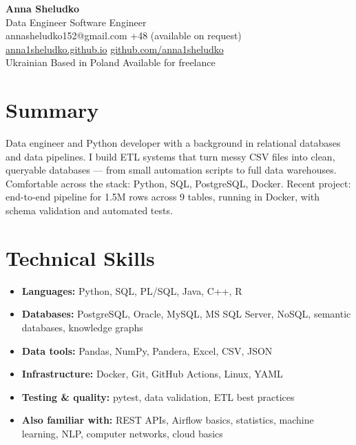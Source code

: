 \documentclass[10pt,a4paper]{article}
\begin{document}
\begin{center}
  {\LARGE\bfseries Anna Sheludko}\\[0.35em]
  Data Engineer \textbar{} Software Engineer\\[0.3em]
  annasheludko152@gmail.com \textbar{} +48 (available on request)\\
  \href{https://anna1sheludko.github.io}{anna1sheludko.github.io} \textbar{} 
  \href{https://github.com/anna1sheludko}{github.com/anna1sheludko}\\[0.3em]
  Ukrainian \textbar{} Based in Poland \textbar{} Available for freelance
\end{center}

\section{Summary}
Data engineer and Python developer with a background in relational databases and
data pipelines. I build ETL systems that turn messy CSV files into clean,
queryable databases --- from small automation scripts to full data warehouses.
Comfortable across the stack: Python, SQL, PostgreSQL, Docker. Recent project:
end-to-end pipeline for 1.5M rows across 9 tables, running in Docker, with
schema validation and automated tests.

\section{Technical Skills}
\begin{itemize}
  \item \textbf{Languages:} Python, SQL, PL/SQL, Java, C++, R
  \item \textbf{Databases:} PostgreSQL, Oracle, MySQL, MS SQL Server, NoSQL,
        semantic databases, knowledge graphs
  \item \textbf{Data tools:} Pandas, NumPy, Pandera, Excel, CSV, JSON
  \item \textbf{Infrastructure:} Docker, Git, GitHub Actions, Linux, YAML
  \item \textbf{Testing \& quality:} pytest, data validation, ETL best practices
  \item \textbf{Also familiar with:} REST APIs, Airflow basics, statistics,
        machine learning, NLP, computer networks, cloud basics
\end{itemize}
\end{document}
